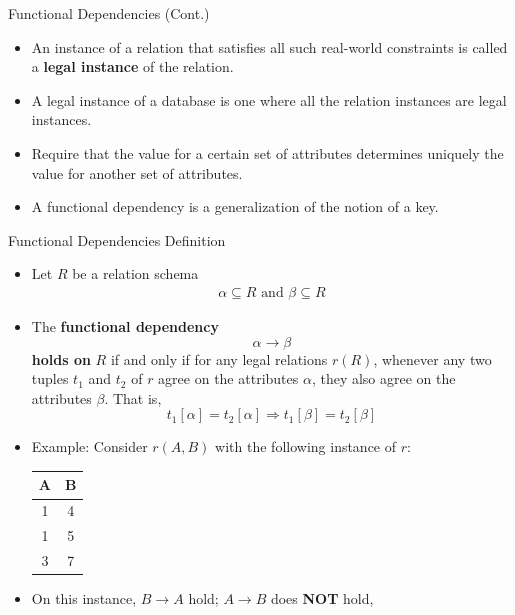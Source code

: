 \documentclass[aspectratio=169]{beamer}
\begin{document}
\begin{frame}{Functional Dependencies (Cont.)}
    \begin{itemize}
        \item An instance of a relation that satisfies all such real-world constraints is called a \textbf{legal instance} of the relation.
        \item A legal instance of a database is one where all the relation instances are legal instances.
        \item Require that the value for a certain set of attributes determines uniquely the value for another set of attributes.
        \item A functional dependency is a generalization of the notion of a key.
    \end{itemize}
\end{frame}

\begin{frame}{Functional Dependencies Definition}
    \begin{itemize}
        \footnotesize
        \item Let $R$ be a relation schema
            \begin{equation*}
                \begin{align*}
                    \alpha \subseteq R \text{ and } \beta \subseteq R
                \end{align*}
            \end{equation*}
        \item The \textbf{functional dependency}
            $$
                \alpha \rightarrow \beta
            $$
            \textbf{holds on} $R$ if and only if for any legal relations $r(R)$, whenever any two tuples $t_1$ and $t_2$ of $r$ agree on the attributes $\alpha$, they also agree on the attributes $\beta$. That is,
            $$
                t_1[\alpha] = t_2[\alpha] \Rightarrow t_1[\beta] = t_2 [\beta]
            $$
        \item Example: Consider $r(A,B)$ with the following instance of $r$: \\
            \centering
            \begin{tabular}{|c|c|}
                \hline
                \textbf{A} & \textbf{B} \\ \hline
                1 & 4 \\ \hline
                1 & 5 \\ \hline
                3 & 7 \\ \hline
            \end{tabular}
        \item On this instance, $B \rightarrow A$ hold; $A \rightarrow B$ does \textbf{NOT} hold,
    \end{itemize}
\end{frame}
\end{document}
